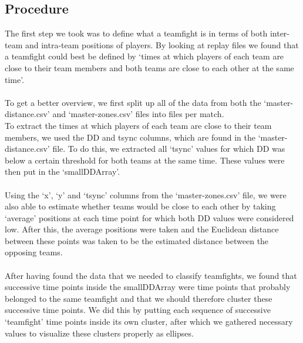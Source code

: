 \documentclass[11pt,twoside,a4paper]{article}
\begin{document}
\subsection*{Procedure}
The first step we took was to define what a teamfight is in terms of both inter-team and intra-team positions of players. By looking at replay files we found that a teamfight could best be defined by `times at which players of each team are close to their team members and both teams are close to each other at the same time'.\\
\\
To get a better overview, we first split up all of the data from both the `master-distance.csv' and `master-zones.csv' files into files per match.\\
To extract the times at which players of each team are close to their team members, we used the DD and tsync columns, which are found in the `master-distance.csv' file. To do this, we extracted all `tsync' values for which DD was below a certain threshold for both teams at the same time. These values were then put in the `smallDDArray'.\\
\\
Using the `x', `y' and `tsync' columns from the `master-zones.csv' file, we were also able to estimate whether teams would be close to each other by taking `average' positions at each time point for which both DD values were considered low. After this, the average positions were taken and the Euclidean distance between these points was taken to be the estimated distance between the opposing teams.\\
\\
After having found the data that we needed to classify teamfights, we found that successive time points inside the smallDDArray were time points that probably belonged to the same teamfight and that we should therefore cluster these successive time points. We did this by putting each sequence of successive `teamfight' time points inside its own cluster, after which we gathered necessary values to visualize these clusters properly as ellipses.\\
\newpage
\end{document}
